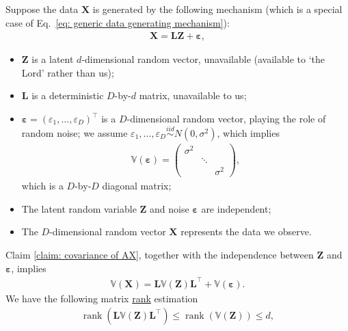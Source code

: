 \documentclass[11pt,letterpaper, leqno]{article}
\numberwithin{equation}{section}
\numberwithin{theorem}{section}
\numberwithin{lemma}{section}
\numberwithin{corollary}{section}
\numberwithin{definition}{section}
\numberwithin{proposition}{section}
\numberwithin{remark}{section}
\numberwithin{example}{section}
\newcommand{\T}{\intercal}
\begin{document}
Suppose the data $\boldsymbol{X}$ is generated by the following mechanism (which is a special case of Eq.~\eqref{eq: generic data generating mechanism}):
\begin{align*}
    \boldsymbol{X}=\boldsymbol{LZ}+\boldsymbol{\varepsilon},
\end{align*}
\begin{itemize}
    \item $\boldsymbol{Z}$ is a latent $d$-dimensional random vector, unavailable (available to `the Lord' rather than us);

    \item $\boldsymbol{L}$ is a deterministic $D$-by-$d$ matrix, unavailable to us;

    \item $\boldsymbol{\varepsilon}=(\varepsilon_1, \ldots, \varepsilon_D)^\T$ is a $D$-dimensional random vector, playing the role of random noise; we assume $\varepsilon_1, \ldots, \varepsilon_D \overset{iid}{\sim} N(0, \sigma^2)$, which implies
    \begin{align}\label{eq: covariance matrix of noise}
        \mathbb{V}(\boldsymbol{\varepsilon}) = 
        \begin{pmatrix}
    \sigma^2 & & \\
    & \ddots & \\
    & & \sigma^2
  \end{pmatrix},
    \end{align}
    which is a $D$-by-$D$ diagonal matrix;

    \item The latent random variable $\boldsymbol{Z}$ and noise $\boldsymbol{\varepsilon}$ are independent;

    \item The $D$-dimensional random vector $\boldsymbol{X}$ represents the data we observe.
\end{itemize}
Claim \ref{claim: covariance of AX}, together with the independence between $\boldsymbol{Z}$ and $\boldsymbol{\varepsilon}$, implies
\begin{align}\label{eq: variance decomposition}
    \mathbb{V}(\boldsymbol{X})=\boldsymbol{L}\mathbb{V}(\boldsymbol{Z})\boldsymbol{L}^\T + \mathbb{V}(\boldsymbol{\varepsilon}).
\end{align}
We have the following matrix \href{https://en.wikipedia.org/wiki/Rank_(linear_algebra)}{rank} estimation
\begin{align*}
    \operatorname{rank}( \boldsymbol{L}\mathbb{V}(\boldsymbol{Z})\boldsymbol{L}^\T ) \le \operatorname{rank}(\mathbb{V}(\boldsymbol{Z})) \le d,
\end{align*}
\end{document}
